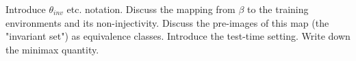 Introduce $\theta_{inv}$ etc. notation. Discuss the mapping from $\beta$ to the training environments and its non-injectivity. Discuss the pre-images of this map (the "invariant set") as equivalence classes. Introduce the test-time setting. Write down the minimax quantity. 